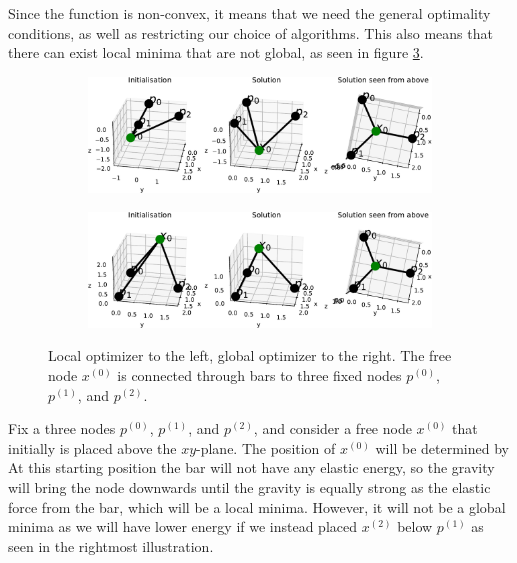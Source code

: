 Since the function is non-convex, it means that we need the general optimality conditions, as well as restricting our choice of algorithms. This also means that there can exist local minima that are not global, as seen in figure \ref{fig:local_optimizer}. 
\begin{figure}
\centering
\begin{subfigure}{.5\textwidth}
  \centering
  \includegraphics[width=\linewidth]{Bilder/localminpos.pdf}
  \label{fig:}
\end{subfigure}%
\begin{subfigure}{.5\textwidth}
  \centering
  \includegraphics[width=1\linewidth]{Bilder/localminneg.pdf}
  \label{fig:sub2}
\end{subfigure}
\caption{Local optimizer to the left, global optimizer to the right. The free node $x^{(0)}$ is connected through bars to three fixed nodes  $p^{(0)}$, $p^{(1)}$, and $p^{(2)}$.}
\label{fig:local_optimizer}
\end{figure}

Fix a three nodes $p^{(0)}$, $p^{(1)}$, and $p^{(2)}$, and consider a free node $x^{(0)}$ that initially is placed above the $xy$-plane. The position of $x^{(0)}$ will be determined by  
At this starting position the bar will not have any elastic energy, so the gravity will bring the node downwards until the gravity is equally strong as the elastic force from the bar, which will be a local minima. However, it will not be a global minima as we will have lower energy if we instead placed $x^{(2)}$ below $p^{(1)}$ as seen in the rightmost illustration. 



